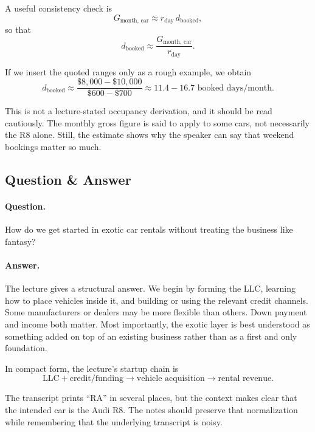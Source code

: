 A useful consistency check is
\begin{equation}
G_{\text{month, car}} \approx r_{\text{day}}\,d_{\text{booked}},
\end{equation}
so that
\begin{equation}
d_{\text{booked}} \approx \frac{G_{\text{month, car}}}{r_{\text{day}}}.
\end{equation}

If we insert the quoted ranges only as a rough example, we obtain
\begin{equation}
d_{\text{booked}} \approx \frac{\$8{,}000 - \$10{,}000}{\$600 - \$700}
\approx 11.4 - 16.7 \text{ booked days/month}.
\end{equation}

This is not a lecture-stated occupancy derivation, and it should be read cautiously. The monthly gross figure is said to apply to some cars, not necessarily the R8 alone. Still, the estimate shows why the speaker can say that weekend bookings matter so much.

\subsection{Question \& Answer}

\paragraph{Question.} How do we get started in exotic car rentals without treating the business like fantasy?

\paragraph{Answer.} The lecture gives a structural answer. We begin by forming the LLC, learning how to place vehicles inside it, and building or using the relevant credit channels. Some manufacturers or dealers may be more flexible than others. Down payment and income both matter. Most importantly, the exotic layer is best understood as something added on top of an existing business rather than as a first and only foundation.

In compact form, the lecture's startup chain is
\begin{equation}
\text{LLC} + \text{credit/funding} \to \text{vehicle acquisition} \to \text{rental revenue}.
\end{equation}

\begin{remark}
The transcript prints ``RA'' in several places, but the context makes clear that the intended car is the Audi R8. The notes should preserve that normalization while remembering that the underlying transcript is noisy.
\end{remark}

